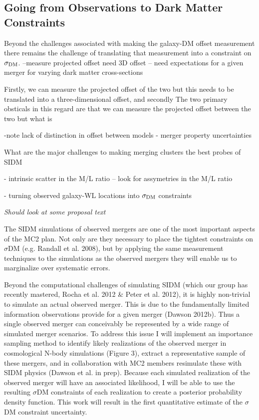 {\subsection{Going from Observations to Dark Matter Constraints}

Beyond the challenges associated with making the galaxy-DM offset measurement there remains the challenge of translating that measurement into a constraint on $\sigma_{\rm DM}$.
--measure projected offset need 3D offset
-- need expectations for a given merger for varying dark matter cross-sections

Firstly, we can measure the projected offset of the two but this needs to be translated into a three-dimensional offset, and secondly 
The two primary obsticals in this regard are that we can measure the projected offset between the two but what is 

-note lack of distinction in offset between models
- merger property uncertainties

What are the major challenges to making merging clusters the best probes of SIDM

- intrinsic scatter in the M/L ratio \citep{Sheldon:2009fr}
-- look for assymetries in the M/L ratio

- turning observed galaxy-WL locations into $\sigma_{\rm DM}$ constraints




\textit{Should look at some proposal text}

The SIDM simulations of observed mergers are one of the most important aspects of the MC2 plan.  Not only are they necessary to place the tightest constraints on $\sigma$DM  (e.g. Randall et al. 2008), but by applying the same measurement techniques to the simulations as the observed mergers they will enable us to marginalize over systematic errors.  

Beyond the computational challenges of simulating SIDM (which our group has recently mastered, Rocha et al. 2012 \& Peter et al. 2012), it is highly non-trivial to simulate an actual observed merger. This is due to the fundamentally limited information observations provide for a given merger (Dawson 2012b). Thus a single observed merger can conceivably be represented by a wide range of simulated merger scenarios. To address this issue I will implement an importance sampling method to identify likely realizations of the observed merger in cosmological N-body simulations (Figure 3), extract a representative sample of these mergers, and in collaboration with MC2 members resimulate these with SIDM physics (Dawson et al. in prep).  Because each simulated realization of the observed merger will have an associated likelihood, I will be able to use the resulting $\sigma$DM  constraints of each realization to create a posterior probability density function.  This work will result in the first quantitative estimate of the $\sigma$DM  constraint uncertainty. 

}
